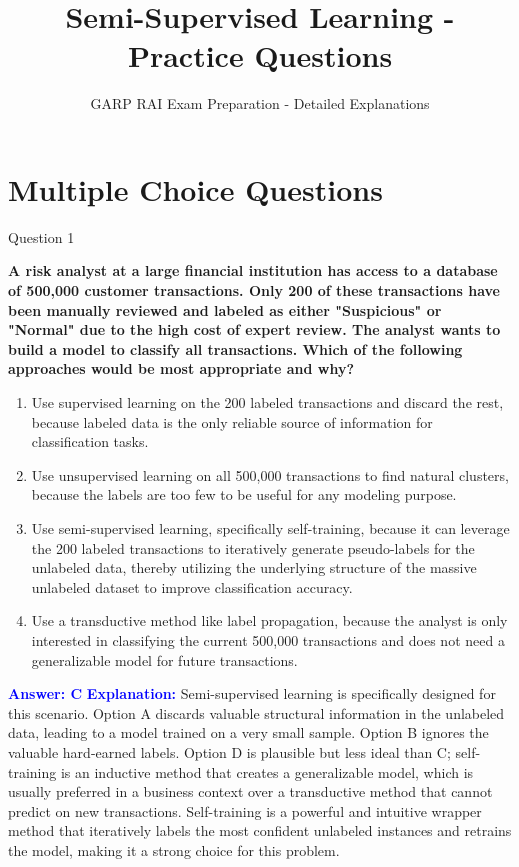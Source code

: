 \documentclass[8pt]{beamer}  %
\title{Semi-Supervised Learning - Practice Questions}
\subtitle{GARP RAI Exam Preparation - Detailed Explanations}
\author{}
\date{}
\begin{document}
	
	\begin{frame}
		\titlepage
	\end{frame}
	
	\section{Multiple Choice Questions}
	
	\begin{frame}{Question 1}
		
		\textbf{A risk analyst at a large financial institution has access to a database of 500,000 customer transactions. Only 200 of these transactions have been manually reviewed and labeled as either "Suspicious" or "Normal" due to the high cost of expert review. The analyst wants to build a model to classify all transactions. Which of the following approaches would be most appropriate and why?}
		\begin{enumerate}
			\item Use supervised learning on the 200 labeled transactions and discard the rest, because labeled data is the only reliable source of information for classification tasks.
			\item Use unsupervised learning on all 500,000 transactions to find natural clusters, because the labels are too few to be useful for any modeling purpose.
			\item Use semi-supervised learning, specifically self-training, because it can leverage the 200 labeled transactions to iteratively generate pseudo-labels for the unlabeled data, thereby utilizing the underlying structure of the massive unlabeled dataset to improve classification accuracy.
			\item Use a transductive method like label propagation, because the analyst is only interested in classifying the current 500,000 transactions and does not need a generalizable model for future transactions.
		\end{enumerate}
		\vspace{0.2cm}
		\textcolor{blue}{\textbf{Answer: C}}
		\vspace{0.2cm}
		\textcolor{blue}{\textbf{Explanation:}} Semi-supervised learning is specifically designed for this scenario. Option A discards valuable structural information in the unlabeled data, leading to a model trained on a very small sample. Option B ignores the valuable hard-earned labels. Option D is plausible but less ideal than C; self-training is an inductive method that creates a generalizable model, which is usually preferred in a business context over a transductive method that cannot predict on new transactions. Self-training is a powerful and intuitive wrapper method that iteratively labels the most confident unlabeled instances and retrains the model, making it a strong choice for this problem.
	\end{frame}
	
\end{document}
